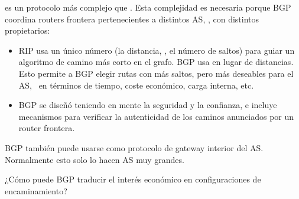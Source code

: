 \begin{itemize}
 es un protocolo más complejo que . Esta complejidad
es necesaria porque BGP coordina routers frontera pertenecientes a distintos AS, \ie,
con distintos propietarios:\\[-0.4cm]
\begin{itemize}
\item RIP usa un único número (la distancia, \ie, el número de saltos)
para guiar un algoritmo de camino más corto en el grafo. BGP usa  en lugar de distancias.
Esto permite a BGP elegir rutas con más saltos, pero más deseables para el AS,
\eg\ en términos de tiempo, coste económico, carga interna, etc.\\[-0.4cm]

\item BGP se diseñó teniendo en mente la seguridad y la confianza, e incluye mecanismos
para verificar la autenticidad de los caminos anunciados por un router frontera.
\end{itemize}
\end{itemize}

\begin{remark}
BGP también puede usarse como protocolo de gateway interior del AS.
Normalmente esto solo lo hacen AS muy grandes.
\end{remark}

\begin{exercise}
¿Cómo puede BGP traducir el interés económico en configuraciones de encaminamiento?
\end{exercise}

